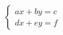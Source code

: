 \documentclass[preview]{standalone}
\begin{document}
\begin{align*}
\left\{ \begin{array}{cl} ax + by = c \\ dx + ey = f \end{array} \right.
\end{align*}
\end{document}
